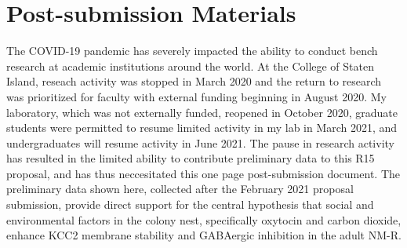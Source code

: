 \documentclass[11pt]{nih}
\def\mydate{2005-06-09 13:58:03 brd}
\begin{document}
\bigskip

\appendix 


\setcounter{page}{20} %



\section{Post-submission Materials}
\par The COVID-19 pandemic has severely impacted the ability to conduct bench research at academic institutions around the world. At the College of Staten Island,  reseach activity was stopped in March 2020 and the return to research was prioritized for faculty with external funding beginning in August 2020. My laboratory, which was not externally funded, reopened in October 2020, graduate students were permitted to resume limited activity in my lab in March 2021, and undergraduates will resume activity in June 2021. The pause in research activity has resulted in the limited ability to contribute preliminary data to this R15 proposal, and has thus neccesitated this one page post-submission document. The preliminary data shown here, collected after the February 2021 proposal submission, provide direct support for the central hypothesis that social and environmental factors in the colony nest, specifically oxytocin and carbon dioxide, enhance KCC2 membrane stability and GABAergic inhibition in the adult NM-R.
\end{document}
